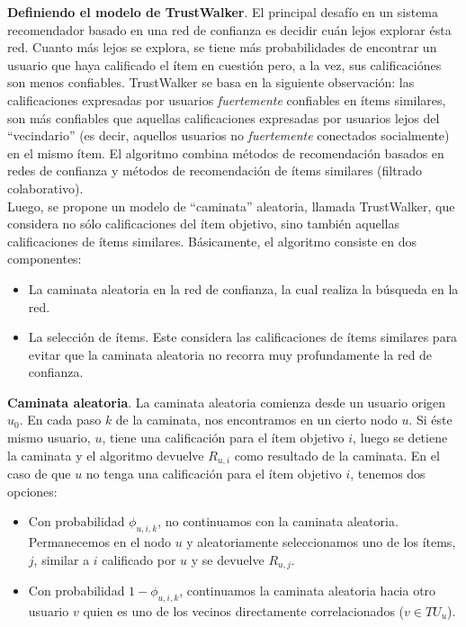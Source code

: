 			\textbf{Definiendo el modelo de TrustWalker}. El principal desafío en un sistema recomendador basado en una red de confianza es decidir cuán lejos explorar ésta red. Cuanto más lejos se explora, se tiene más probabilidades de encontrar un usuario que haya calificado el ítem en cuestión pero, a la vez, sus calificaciónes son menos confiables. TrustWalker se basa en la siguiente observación: las calificaciones expresadas por usuarios \textit{fuertemente} confiables en ítems similares, son más confiables que aquellas calificaciones expresadas por usuarios lejos del \enquote{vecindario} (es decir, aquellos usuarios no \textit{fuertemente} conectados socialmente) en el mismo ítem. El algoritmo combina métodos de recomendación basados en redes de confianza y métodos de recomendación de ítems similares (filtrado colaborativo). \\
			Luego, se propone un modelo de \enquote{caminata} aleatoria, llamada TrustWalker, que considera no sólo calificaciones del ítem objetivo, sino también aquellas calificaciones de ítems similares. Básicamente, el algoritmo consiste en dos componentes:
			\begin{itemize}
				\item La caminata aleatoria en la red de confianza, la cual realiza la búsqueda en la red.
				\item La selección de ítems. Este considera las calificaciones de ítems similares para evitar que la caminata aleatoria no recorra muy profundamente la red de confianza.
			\end{itemize}
			
			\textbf{Caminata aleatoria}. La caminata aleatoria comienza desde un usuario origen $u_0$. En cada paso $k$ de la caminata, nos encontramos en un cierto nodo $u$. Si éste mismo usuario, $u$, tiene una calificación para el ítem objetivo $i$, luego se detiene la caminata y el algoritmo devuelve $R_{u,i}$ como resultado de la caminata. En el caso de que $u$ no tenga una calificación para el ítem objetivo $i$, tenemos dos opciones:
			\begin{itemize}
				\item Con probabilidad $\phi_{u,i,k}$, no continuamos con la caminata aleatoria. Permanecemos en el nodo $u$ y aleatoriamente seleccionamos uno de los ítems, $j$, similar a $i$ calificado por $u$ y se devuelve $R_{u,j}$.
				\item Con probabilidad $1 - \phi_{u,i,k}$, continuamos la caminata aleatoria hacia otro usuario $v$ quien es uno de los vecinos directamente correlacionados ($v \in TU_u$).
			\end{itemize}
			

